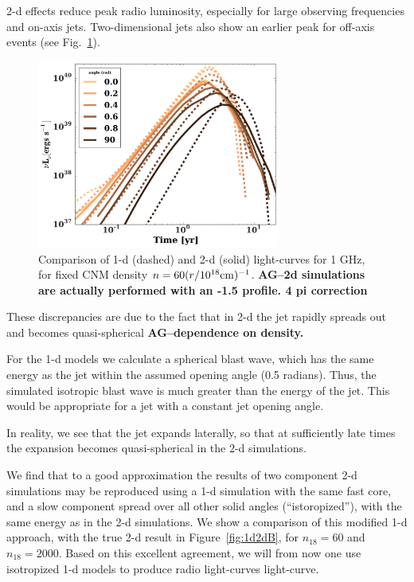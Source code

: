 \documentclass[usenatbib,fleqn]{mnras}
\begin{document}
2-d effects reduce peak radio luminosity, especially for large
observing frequencies and on-axis jets. Two-dimensional jets also show
an earlier peak for off-axis events (see Fig.~\ref{fig:1d2d}).

\begin{figure}
\includegraphics[width=8cm]{comparison_1ghz.pdf}
\caption{\label{fig:1d2d} Comparison of 1-d (dashed) and 2-d (solid)
  light-curves for 1 GHz, for fixed CNM density $n=60
    (r/10^{18} {\rm cm})^{-1}$. {\bf AG--2d simulations are actually
      performed with an -1.5 profile. 4 pi correction}}
\end{figure}

These discrepancies are due to the fact that in 2-d the jet rapidly
spreads out and becomes quasi-spherical {\bf AG--dependence on
  density.} 

For the 1-d models we calculate a spherical blast wave, which has the
same energy as the jet within the assumed opening angle (0.5 radians).
Thus, the simulated isotropic blast wave is much greater than the energy of
the jet. This would be appropriate for a jet with a constant jet
opening angle.

In reality, we see that the jet expands laterally, so that at
sufficiently late times the expansion becomes quasi-spherical in the
2-d simulations.

We find that to a good approximation the results of two component 2-d
simulations may be reproduced using a 1-d simulation with the same
fast core, and a slow component spread over all other solid angles
(``istoropized''), with the same energy as in the 2-d simulations.  We
show a comparison of this modified 1-d approach, with the true 2-d
result in Figure~\ref{fig:1d2dB}, for $n_{18}=60$ and $n_{18}=2000$.
Based on this excellent agreement, we will from now one use
  isotropized 1-d models to produce radio light-curves light-curve.
\end{document}
